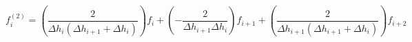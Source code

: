 \begin{equation} 
f^{{(2)}}_{i} = \left(\frac{2}{\Delta h_{{i}} \left(\Delta h_{{i+1}} + \Delta h_{{i}}\right)}\right)f_{{i}}+ \left(- \frac{2}{\Delta h_{{i+1}} \Delta h_{{i}}}\right)f_{{i+1}}+ \left(\frac{2}{\Delta h_{{i+1}} \left(\Delta h_{{i+1}} + \Delta h_{{i}}\right)}\right)f_{{i+2}}
 \end{equation} 
